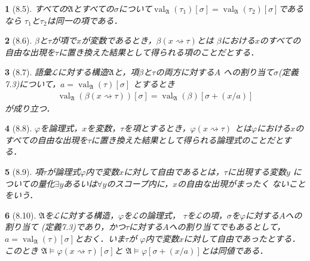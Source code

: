 \documentclass[a4j,10.5pt,oneside,openany]{jsbook}
\theoremstyle{mystyle}
\newtheorem{thm}{\color{DarkMidnightBlue}{定理}}[section]
\newtheorem{dfn}[thm]{\color{PakistanGreen}{定義}}
\newcommand{\val}{\operatorname{val}} %
\begin{document}
	\begin{screen}
		\begin{thm}[8.5]
			すべての$\mathfrak{A}$とすべての$\sigma$について$\val_{\mathfrak{A}}(\tau_{1})[\sigma]
			= \val_{\mathfrak{A}}(\tau_{2})[\sigma]$であるなら
			$\tau_{1}$と$\tau_{2}$は同一の項である．
		\end{thm}
	\end{screen}
	
	\begin{screen}
		\begin{dfn}[8.6]
			$\beta$と$\tau$が項で$x$が変数であるとき，$\beta(x \rightsquigarrow \tau)$とは
			$\beta$における$x$のすべての自由な出現を$\tau$に置き換えた結果として得られる項のことだとする．
		\end{dfn}
	\end{screen}
	
	\begin{screen}
		\begin{thm}[8.7]
			語彙$\mathcal{L}$に対する構造$\mathfrak{A}$と，項$\beta$と$\tau$の両方に対する$A$
			への割り当て$\sigma$(定義7.3)について，$a = \val_{\mathfrak{A}}(\tau)[\sigma]$
			とするとき
			\begin{align}
				\val_{\mathfrak{A}}(\beta(x \rightsquigarrow \tau))[\sigma]
				= \val_{\mathfrak{A}}(\beta)[\sigma + (x/a)]
			\end{align}
			が成り立つ．
		\end{thm}
	\end{screen}
	
	\begin{screen}
		\begin{dfn}[8.8]
			$\varphi$を論理式，$x$を変数，$\tau$を項とするとき，$\varphi(x \rightsquigarrow \tau)$
			とは$\varphi$における$x$のすべての自由な出現を$\tau$に置き換えた結果として得られる論理式のことだとする．
		\end{dfn}
	\end{screen}
	
	\begin{screen}
		\begin{dfn}[8.9]
			項$\tau$が論理式$\varphi$内で変数$x$に対して自由であるとは，$\tau$に出現する変数$y$
			についての量化$\exists y$あるいは$\forall y$のスコープ内に，$x$の自由な出現がまったく
			ないことをいう．
		\end{dfn}
	\end{screen}
	
	\begin{screen}
		\begin{thm}[8.10]
			$\mathfrak{A}$を$\mathcal{L}$に対する構造，$\varphi$を$\mathcal{L}$の論理式，
			$\tau$を$\mathcal{L}$の項，$\sigma$を$\varphi$に対する$A$への割り当て
			(定義7.3)であり，かつ$\tau$に対する$A$への割り当てでもあるとして，
			$a = \val_{\mathfrak{A}}(\tau)[\sigma]$とおく．いま$\tau$が
			$\varphi$内で変数$x$に対して自由であったとする．このとき
			$\mathfrak{A} \models \varphi(x \rightsquigarrow \tau)[\sigma]$と
			$\mathfrak{A} \models \varphi[\sigma + (x/a)]$とは同値である．
		\end{thm}
	\end{screen}
	
\end{document}
